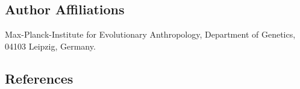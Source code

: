 \documentclass[9pt,twocolumn,twoside,lineno]{pnas-new}
\begin{document}
\subsection*{Author Affiliations}

Max-Planck-Institute for Evolutionary Anthropology, Department of Genetics, 04103 Leipzig, Germany.

\subsection*{References}



\end{document}
